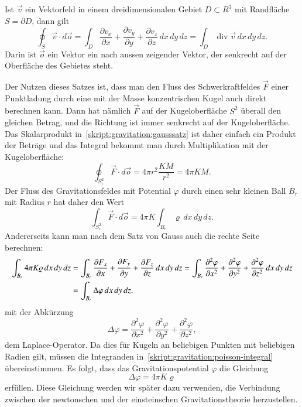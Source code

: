 \begin{satz}[Gauss] Ist $\vec v$ ein Vektorfeld in
einem dreidimensionalen Gebiet $D\subset R^3$ mit Randfläche $S=\partial D$,
dann gilt
\begin{equation}
\oint_S \vec v\cdot d\vec o
=
\int_D 
\frac{\partial v_x}{\partial x}
+
\frac{\partial v_y}{\partial y}
+
\frac{\partial v_z}{\partial z}
\,dx\,dy\,dz
=
\int_D \operatorname{div}\vec v\,dx\,dy\,dz.
\label{skript:gravitation:gausssatz}
\end{equation}
Darin ist $\vec o$ ein Vektor ein nach aussen zeigender Vektor, der
senkrecht auf der Oberfläche des Gebietes steht.
\end{satz}

Der Nutzen dieses Satzes ist, dass man den Fluss des Schwerkraftfeldes
$\vec F$ einer Punktladung durch eine mit der Masse konzentrischen
Kugel auch direkt berechnen kann.
Dann hat nämlich $\vec F$ auf der Kugeloberfläche $S^2$ überall den gleichen
Betrag, und die Richtung ist immer senkrecht auf der Kugeloberfläche.
Das Skalarprodukt in~\eqref{skript:gravitation:gausssatz} ist daher
einfach ein Produkt der Beträge und das Integral bekommt man durch
Multiplikation mit der Kugeloberfläche:
\[
\oint_{S^2_r} \vec F\cdot d\vec o
=
4\pi r^2
\frac{KM}{r^2}
=
4\pi KM.
\]
Der Fluss des Gravitationsfeldes mit Potential $\varphi$ durch einen
sehr kleinen Ball $B_r$ mit Radius $r$ hat daher den Wert
\[
\int_{S^2_r}\vec F\cdot d\vec o
=
4\pi K\int_{B_r} \varrho\,dx\,dy\,dz.
\]
Andererseits kann man nach dem Satz von Gauss auch die rechte 
Seite berechnen:
\begin{align}
\int_{B_r} 4\pi K\varrho\,dx\,dy\,dz
&=
\int_{B_r}
\frac{\partial F_x}{\partial x}+
\frac{\partial F_y}{\partial y}+
\frac{\partial F_z}{\partial z}
\,dx\,dy\,dz
=
\int_{B_r}
\frac{\partial^2\varphi}{\partial x^2}+
\frac{\partial^2\varphi}{\partial y^2}+
\frac{\partial^2\varphi}{\partial z^2}
\,dx\,dy\,dz
\notag
\\
&=
\int_{B_r} \Delta\varphi\,dx\,dy\,dz.
\label{skript:gravitation:poisson-integral}
\end{align}
mit der Abkürzung
\begin{equation*}
\Delta \varphi
=
\frac{\partial^2\varphi}{\partial x^2}+
\frac{\partial^2\varphi}{\partial y^2}+
\frac{\partial^2\varphi}{\partial z^2},
\end{equation*}
dem Laplace-Operator.
Da dies für Kugeln an beliebigen Punkten mit beliebigen Radien 
gilt, müssen die Integranden in~\eqref{skript:gravitation:poisson-integral}
übereinstimmen.
Es folgt, dass das Gravitationspotential $\varphi$ die Gleichung
\begin{equation}
\Delta \varphi = 4\pi K\varrho
\label{skript:gravitation:potentialgleichung}
\end{equation}
erfüllen.
Diese Gleichung werden wir später dazu verwenden, die Verbindung zwischen
der newtonschen und der einsteinschen Gravitationstheorie herzustellen.

